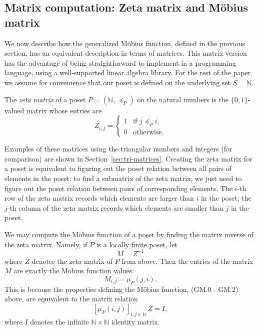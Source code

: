 \documentclass{amsart}
\theoremstyle{definition}
\newcommand{\NN}{\mathbb{N}}
\newcommand{\Mobius}{M\"obius}
\newcommand{\leqP}{\preccurlyeq_P}
\begin{document}
\subsection{Matrix computation: Zeta matrix and \Mobius{} matrix}\label{sec:mobius-matrix}

We now describe how the generalized \Mobius{} function, defined in the previous section, has an equivalent description in terms of matrices.
This matrix version has the advantage of being straightforward to implement in a programming language, using a well-supported linear algebra library.
For the rest of the paper, we assume for convenience that our poset is defined on the underlying set $S = \NN$.

The {\em zeta matrix} of a poset $P = (\NN, \leqP)$ on the natural numbers is the $\{0,1\}$-valued matrix whose entries are
\[
    Z_{i,j} = \begin{cases}
    1 &\text{if } j \leqP i, \\
    0 &\text{otherwise.}
    \end{cases}
\]

Examples of these matrices using the triangular numbers and integers (for comparison) are shown in Section~\ref{sec:tri-matrices}. 
Creating the zeta matrix for a poset
is equivalent to figuring out the poset relation between all pairs of elements in the poset;
to find a submatrix of the zeta matrix, we just need to figure out the poset relation between pairs of corresponding elements. 
The $i$-th row of the zeta matrix records which elements are larger than $i$ in the poset; 
the $j$-th column of the zeta matrix records which elements are smaller than $j$ in the poset.

We may compute the \Mobius{} function of a poset by finding the matrix inverse of the zeta matrix.
Namely, if $P$ is a locally finite poset, let 
\begin{equation}
    M = Z^{-1}
\end{equation}
where $Z$ denotes the zeta matrix of $P$ from above. 
Then the entries of the matrix $M$ are exactly the \Mobius{} function values:
\begin{equation}\label{eq:mobius-matrix}
    M_{i, j} = \mu_{P} (j, i).
\end{equation}
This is because the properties defining the \Mobius{} function, (GM.0 - GM.2) above, are equivalent to the matrix relation
\[
    [\mu_P(i, j)]_{i, j \in \NN} \, Z = I,
\]
where $I$ denotes the infinite $\NN \times \NN$ identity matrix.
\end{document}
